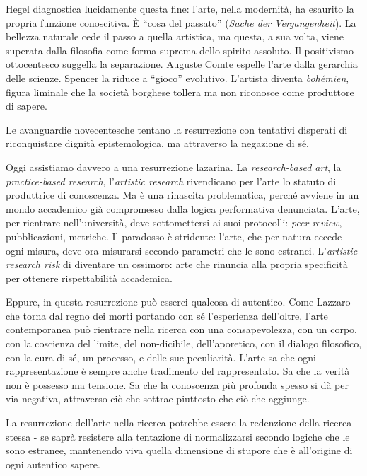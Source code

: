 Hegel diagnostica lucidamente questa fine: l'arte, nella modernità, ha esaurito
la propria funzione conoscitiva. È “cosa del passato” (\emph{Sache der Vergangenheit}).
La bellezza naturale cede il passo a quella artistica, ma questa, a sua volta,
viene superata dalla filosofia come forma suprema dello spirito assoluto.
Il positivismo ottocentesco suggella la separazione. Auguste Comte espelle
l'arte dalla gerarchia delle scienze. Spencer la riduce a “gioco” evolutivo.
L'artista diventa \emph{bohémien}, figura liminale che la società borghese
tollera ma non riconosce come produttore di sapere.

Le avanguardie novecentesche tentano la resurrezione con tentativi disperati di
riconquistare dignità epistemologica, ma attraverso la negazione di sé.

Oggi assistiamo davvero a una resurrezione lazarina. La \emph{research-based art},
la \emph{practice-based research}, l'\emph{artistic research} rivendicano per
l'arte lo statuto di produttrice di conoscenza. Ma è una rinascita problematica,
perché avviene in un mondo accademico già compromesso dalla logica performativa
denunciata. L'arte, per rientrare nell'università, deve sottomettersi ai suoi
protocolli: \emph{peer review}, pubblicazioni, metriche. Il paradosso è stridente:
l'arte, che per natura eccede ogni misura, deve ora misurarsi secondo parametri
che le sono estranei. L'\emph{artistic research risk} di diventare un ossimoro:
arte che rinuncia alla propria specificità per ottenere rispettabilità accademica.

Eppure, in questa resurrezione può esserci qualcosa di autentico. Come Lazzaro
che torna dal regno dei morti portando con sé l'esperienza dell'oltre, l'arte
contemporanea può rientrare nella ricerca con una consapevolezza, con un corpo,
con la coscienza del limite, del non-dicibile, dell'aporetico, con il dialogo
filosofico, con la cura di sé, un processo, e delle sue peculiarità. L'arte sa
che ogni rappresentazione è sempre anche tradimento del rappresentato. Sa che
la verità non è possesso ma tensione. Sa che la conoscenza più profonda spesso
si dà per via negativa, attraverso ciò che sottrae piuttosto che ciò che aggiunge.

La resurrezione dell'arte nella ricerca potrebbe essere la redenzione della
ricerca stessa - se saprà resistere alla tentazione di normalizzarsi secondo
logiche che le sono estranee, mantenendo viva quella dimensione di stupore che è
all'origine di ogni autentico sapere.

\bigskip

